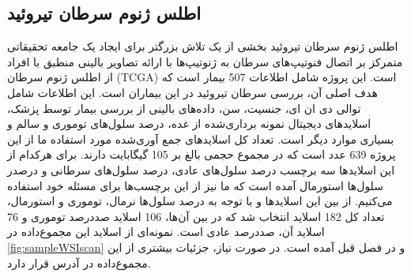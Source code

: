 \subsection{اطلس ژنوم سرطان تیروئید}\label{subsec:موسسه-ملی-سرطان-پورتال-داده-های-مشترک-ژنومیک}

اطلس ژنوم سرطان تیروئید بخشی از یک تلاش بزرگتر برای ایجاد یک جامعه تحقیقاتی متمرکز بر اتصال فنوتیپ‌های سرطان به ژنوتیپ‌ها با ارائه تصاویر بالینی منطبق با افراد از اطلس ژنوم سرطان\cite{clark2013cancer} (TCGA) است.
این پروژه شامل اطلاعات 507 بیمار است که هدف اصلی آن، بررسی سرطان تیروئید در این بیماران است.
این اطلاعات شامل توالی دی ان ای، جنسیت، سن، داده‌های بالینی از بررسی بیمار توسط پزشک، اسلایدهای دیجیتال نمونه برداری‌شده از غده، درصد سلول‌های توموری و سالم و بسیاری موارد دیگر است.
تعداد کل اسلاید‌های جمع آوری‌شده مورد استفاده ما از این پروژه 639 عدد است که در مجموع حجمی بالغ بر 105 گیگابایت دارند. برای هرکدام از این اسلاید‌ها سه برچسب درصد سلول‌های عادی، درصد سلول‌های سرطانی و درصدر سلول‌ها استورمال آمده است که ما نیز از این برچسب‌ها برای مسئله خود استفاده می‌کنیم. از بین این اسلاید‌ها و با توجه به درصد سلول‌ها نرمال، توموری و استورمال، تعداد کل 182 اسلاید انتخاب شد که در بین آن‌ها، 106 اسلاید صددرصد توموری و 76 اسلاید آن، صددرصد عادی است.
نمونه‌ای از اسلاید این مجموع‌داده در \ref{fig:sampleWSIscan}  و در فصل قبل آمده است.
در صورت نیاز، جزئیات بیشتری از این مجموع‌داده در آدرس \cite{ncigdc} قرار دارد.
